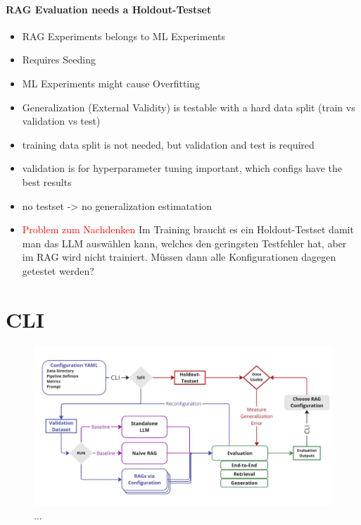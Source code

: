 \paragraph{RAG Evaluation needs a Holdout-Testset}
\begin{itemize}
    \item RAG Experiments belongs to ML Experiments 
    \item Requires Seeding
    \item ML Experiments might cause Overfitting
    \item Generalization (External Validity) is testable with a hard data split (train vs validation vs test)
    \item training data split is not needed, but validation and test is required
    \item validation is for hyperparameter tuning important, which configs have the best results
    \item no testset -> no generalization estimatation
    \item \textcolor{red}{Problem zum Nachdenken} Im Training braucht es ein Holdout-Testset damit man das LLM auswählen kann, welches den geringsten Testfehler hat, aber im RAG wird nicht trainiert. Müssen dann alle Konfigurationen dagegen getestet werden?
\end{itemize}


\section{CLI}

\begin{figure}[!ht]
    \centering
    \includegraphics[width=\textwidth]{images/Sketch.pdf}
    \caption{...}
    \label{fig:EvaluationDesign}
\end{figure}

